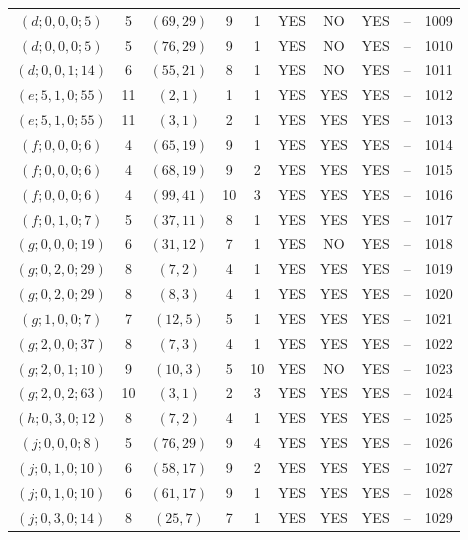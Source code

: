 \begin{longtable}{|c|c|c|c|c|c|c|c|c|c|}
$(d; 0, 0, 0; 5)$ & 5 & $(69, 29)$ & 9 & 1 & YES & NO & YES & -- & 1009\\
$(d; 0, 0, 0; 5)$ & 5 & $(76, 29)$ & 9 & 1 & YES & NO & YES & -- & 1010\\
$(d; 0, 0, 1; 14)$ & 6 & $(55, 21)$ & 8 & 1 & YES & NO & YES & -- & 1011\\
$(e; 5, 1, 0; 55)$ & 11 & $(2, 1)$ & 1 & 1 & YES & YES & YES & -- & 1012\\
$(e; 5, 1, 0; 55)$ & 11 & $(3, 1)$ & 2 & 1 & YES & YES & YES & -- & 1013\\
$(f; 0, 0, 0; 6)$ & 4 & $(65, 19)$ & 9 & 1 & YES & YES & YES & -- & 1014\\
$(f; 0, 0, 0; 6)$ & 4 & $(68, 19)$ & 9 & 2 & YES & YES & YES & -- & 1015\\
$(f; 0, 0, 0; 6)$ & 4 & $(99, 41)$ & 10 & 3 & YES & YES & YES & -- & 1016\\
$(f; 0, 1, 0; 7)$ & 5 & $(37, 11)$ & 8 & 1 & YES & YES & YES & -- & 1017\\
$(g; 0, 0, 0; 19)$ & 6 & $(31, 12)$ & 7 & 1 & YES & NO & YES & -- & 1018\\
$(g; 0, 2, 0; 29)$ & 8 & $(7, 2)$ & 4 & 1 & YES & YES & YES & -- & 1019\\
$(g; 0, 2, 0; 29)$ & 8 & $(8, 3)$ & 4 & 1 & YES & YES & YES & -- & 1020\\
$(g; 1, 0, 0; 7)$ & 7 & $(12, 5)$ & 5 & 1 & YES & YES & YES & -- & 1021\\
$(g; 2, 0, 0; 37)$ & 8 & $(7, 3)$ & 4 & 1 & YES & YES & YES & -- & 1022\\
$(g; 2, 0, 1; 10)$ & 9 & $(10, 3)$ & 5 & 10 & YES & NO & YES & -- & 1023\\
$(g; 2, 0, 2; 63)$ & 10 & $(3, 1)$ & 2 & 3 & YES & YES & YES & -- & 1024\\
$(h; 0, 3, 0; 12)$ & 8 & $(7, 2)$ & 4 & 1 & YES & YES & YES & -- & 1025\\
$(j; 0, 0, 0; 8)$ & 5 & $(76, 29)$ & 9 & 4 & YES & YES & YES & -- & 1026\\
$(j; 0, 1, 0; 10)$ & 6 & $(58, 17)$ & 9 & 2 & YES & YES & YES & -- & 1027\\
$(j; 0, 1, 0; 10)$ & 6 & $(61, 17)$ & 9 & 1 & YES & YES & YES & -- & 1028\\
$(j; 0, 3, 0; 14)$ & 8 & $(25, 7)$ & 7 & 1 & YES & YES & YES & -- & 1029
\end{longtable}
